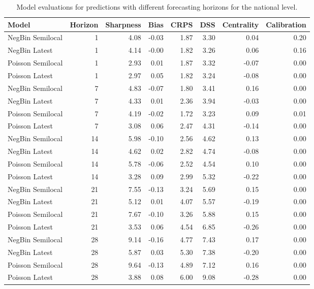 \begin{table}[ht]
\centering
\begin{tabular}{lrrrrrrr}
 Model & Horizon & Sharpness & Bias & CRPS & DSS & Centrality & Calibration \\ 
  \hline
NegBin Semilocal &   1 & 4.08 & -0.03 & 1.87 & 3.30 & 0.04 & 0.20 \\ 
  NegBin Latest &   1 & 4.14 & -0.00 & 1.82 & 3.26 & 0.06 & 0.16 \\ 
  Poisson Semilocal &   1 & 2.93 & 0.01 & 1.87 & 3.32 & -0.07 & 0.00 \\ 
  Poisson Latest &   1 & 2.97 & 0.05 & 1.82 & 3.24 & -0.08 & 0.00 \\ 
   \hline
NegBin Semilocal &   7 & 4.83 & -0.07 & 1.80 & 3.41 & 0.16 & 0.00 \\ 
  NegBin Latest &   7 & 4.33 & 0.01 & 2.36 & 3.94 & -0.03 & 0.00 \\ 
  Poisson Semilocal &   7 & 4.19 & -0.02 & 1.72 & 3.23 & 0.09 & 0.01 \\ 
  Poisson Latest &   7 & 3.08 & 0.06 & 2.47 & 4.31 & -0.14 & 0.00 \\ 
   \hline
NegBin Semilocal &  14 & 5.98 & -0.10 & 2.56 & 4.62 & 0.13 & 0.00 \\ 
  NegBin Latest &  14 & 4.62 & 0.02 & 2.82 & 4.74 & -0.08 & 0.00 \\ 
  Poisson Semilocal &  14 & 5.78 & -0.06 & 2.52 & 4.54 & 0.10 & 0.00 \\ 
  Poisson Latest &  14 & 3.28 & 0.09 & 2.99 & 5.32 & -0.22 & 0.00 \\ 
   \hline
NegBin Semilocal &  21 & 7.55 & -0.13 & 3.24 & 5.69 & 0.15 & 0.00 \\ 
  NegBin Latest &  21 & 5.12 & 0.01 & 4.07 & 5.57 & -0.19 & 0.00 \\ 
  Poisson Semilocal &  21 & 7.67 & -0.10 & 3.26 & 5.88 & 0.15 & 0.00 \\ 
  Poisson Latest &  21 & 3.53 & 0.06 & 4.54 & 6.85 & -0.26 & 0.00 \\ 
   \hline
NegBin Semilocal &  28 & 9.14 & -0.16 & 4.77 & 7.43 & 0.17 & 0.00 \\ 
  NegBin Latest &  28 & 5.87 & 0.03 & 5.30 & 7.38 & -0.20 & 0.00 \\ 
  Poisson Semilocal &  28 & 9.64 & -0.13 & 4.89 & 7.12 & 0.16 & 0.00 \\ 
  Poisson Latest &  28 & 3.88 & 0.08 & 6.00 & 9.08 & -0.28 & 0.00 \\ 
   \hline
\end{tabular}
\caption{Model evaluations for predictions with different forecasting horizons for the national level.} 
\label{tab:nat_evo}
\end{table}
